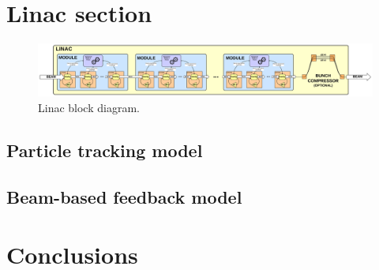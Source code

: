 \documentclass[a4paper,12pt]{article}
\begin{document}
\section{Linac section}

\begin{figure}
\centering
\includegraphics[scale=0.11]{../figures/Linac_block_diagram.png}
\caption{Linac block diagram.}
\label{fig:Linac_block_diagram}
\end{figure}

\subsection{Particle tracking model}

\subsection{Beam-based feedback model}

\section{Conclusions}

\newpage
\end{document}
